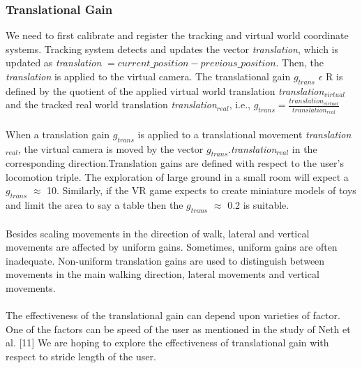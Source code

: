 \documentclass[12pt]{article}
\begin{document}
\subsubsection{Translational Gain}
We need to first calibrate and register the tracking and virtual world coordinate systems. Tracking system detects and updates the vector \textit{translation}, which is updated as \textit{translation} $= current\_position - previous\_position$. Then, the \textit{translation} is applied to the virtual camera. The translational gain $g_{trans}$ $\epsilon$ R is defined by the quotient of the applied virtual world translation \textit{translation}$_{virtual}$ and the tracked real world translation \textit{translation}$_{real}$, i.e.,
$g_{trans} = \frac{translation_{virtual}}{translation_{real}}$\\
\\
When a translation gain $g_{trans}$ is applied to a translational movement \textit{translation}$_{real}$, the virtual camera is moved by the vector $g_{trans}$.\textit{translation}$_{real}$ in the corresponding direction.Translation gains are defined with respect to the user’s locomotion triple. The exploration of large ground in a small room will expect a $g_{trans}$ $\approx$ 10. Similarly, if the VR game expects to create miniature models of toys and limit the area to say a table then the $g_{trans}$ $\approx$ 0.2 is suitable.\\
\\
Besides scaling movements in the direction of walk, lateral and vertical movements are affected by uniform gains. Sometimes, uniform gains are often inadequate. Non-uniform translation gains are used to distinguish between movements in the main walking direction, lateral movements and vertical movements.\\
\\
The effectiveness of the translational gain can depend upon varieties of factor. One of the factors can be speed of the user as mentioned in the study of Neth et al. [11] We are hoping to explore the effectiveness of translational gain with respect to stride length of the user.
\end{document}
